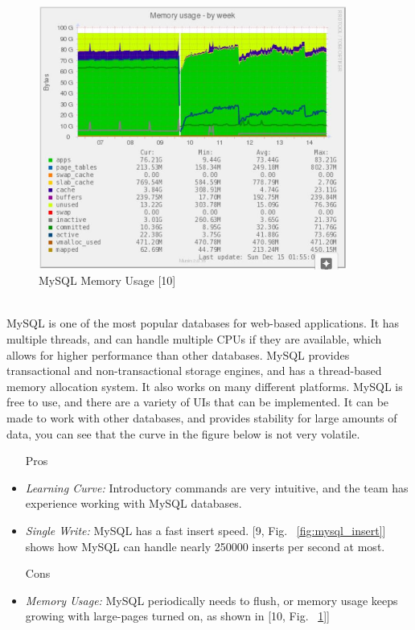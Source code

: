 \documentclass[12pt,journal,compsoc]{IEEEtran}
\newenvironment{subs}
  {\adjustwidth{1em}{0pt}}
  {\endadjustwidth}
\begin{document}
\begin{subs}
\begin{subs}
\begin{subs}
\begin{figure}[H]
\centering
\includegraphics[width=4in]{images/mysql_mem.JPG}
\caption{MySQL Memory Usage [10]}
\label{fig:mysql_mem}
\end{figure}

\\
MySQL is one of the most popular databases for web-based applications. It has multiple threads, and can handle multiple CPUs if they are available, which allows for higher performance than other databases. MySQL provides transactional and non-transactional storage engines, and has a thread-based memory allocation system. It also works on many different platforms. MySQL is free to use, and there are a variety of UIs that can be implemented. It can be made to work with other databases, and provides stability for large amounts of data, you can see that the curve in the figure below is not very volatile.

\begin{subs}
\begin{itemize}
    \item [{Pros}]
    \item \emph{Learning Curve:} Introductory commands are very intuitive, and the team has experience working with MySQL databases.
    \item \emph{Single Write:} MySQL has a fast insert speed. [9, Fig. ~\ref{fig:mysql_insert}] shows how MySQL can handle nearly 250000 inserts per second at most.
    \item [{Cons}]
    \item \emph{Memory Usage:} MySQL periodically needs to flush, or memory usage keeps growing with large-pages turned on, as shown in [10, Fig. ~\ref{fig:mysql_mem}]]
\end{itemize}
\end{subs}
\end{subs}


\end{subs}
\end{subs}
\end{document}
